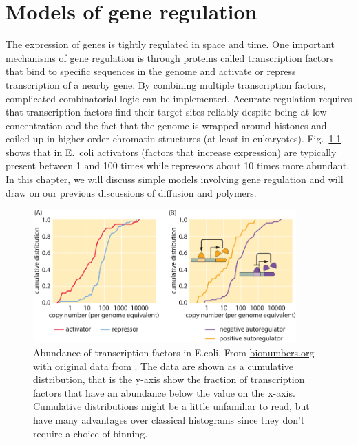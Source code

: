\chapter{Models of gene regulation}

The expression of genes is tightly regulated in space and time.
One important mechanisms of gene regulation is through proteins called transcription factors that bind to specific sequences in the genome and activate or repress transcription of a nearby gene.
By combining multiple transcription factors, complicated combinatorial logic can be implemented.
Accurate regulation requires that transcription factors find their target sites reliably despite being at low concentration and the fact that the genome is wrapped around histones and coiled up in higher order chromatin structures (at least in eukaryotes).
Fig.~\ref{fig:TF_abundance} shows that in E.~coli activators (factors that increase expression) are typically present between 1 and 100 times while repressors about 10 times more abundant.
In this chapter, we will discuss simple models involving gene regulation and will draw on our previous discussions of diffusion and polymers.


\begin{figure}[tb]
	\centering
	\includegraphics[width=0.9\textwidth]{figures/TFCopyNumber_bionumbers.png}
	\caption{Abundance of transcription factors in E.coli. From \href{http://book.bionumbers.org/what-are-the-copy-numbers-of-transcription-factors/}{bionumbers.org} with original data from \citep{li_quantifying_2014}. The data are shown as a cumulative distribution, that is the y-axis show the fraction of transcription factors that have an abundance below the value on the x-axis. Cumulative distributions might be a little unfamiliar to read, but have many advantages over classical histograms since they don't require a choice of binning.}
	\label{fig:TF_abundance}
\end{figure}

